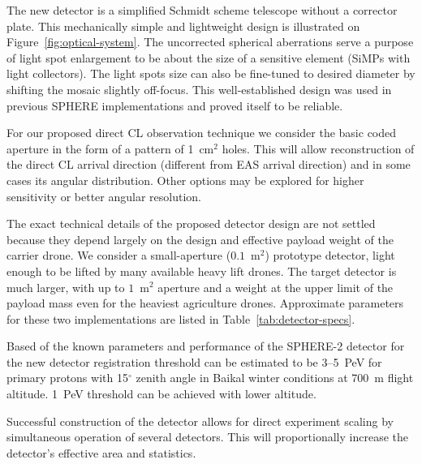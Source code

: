 \documentclass[a4paper,11pt]{article}
\begin{document}
The new detector is a simplified Schmidt scheme telescope without a corrector plate. This mechanically simple and lightweight design is illustrated on Figure~\ref{fig:optical-system}. The uncorrected spherical aberrations serve a purpose of light spot enlargement to be about the size of a sensitive element (SiMPs with light collectors). The light spots size can also be fine-tuned to desired diameter by shifting the mosaic slightly off-focus. This well-established design was used in previous SPHERE implementations and proved itself to be reliable.

For our proposed direct CL observation technique we consider the basic coded aperture in the form of a pattern of 1~cm$^2$ holes. This will allow reconstruction of the direct CL arrival direction (different from EAS arrival direction) and in some cases its angular distribution. Other options may be explored for higher sensitivity or better angular resolution.

The exact technical details of the proposed detector design are not settled because they depend largely on the design and effective payload weight of the carrier drone. We consider a small-aperture ($0.1$~m$^2$) prototype detector, light enough to be lifted by many available heavy lift drones. The target detector is much larger, with up to $1$~m$^2$ aperture and a weight at the upper limit of the payload mass even for the heaviest agriculture drones. Approximate parameters for these two implementations are listed in Table~\ref{tab:detector-specs}.


Based of the known parameters and performance of the SPHERE-2 detector for the new detector registration threshold can be estimated to be 3--5~PeV for primary protons with 15$^\circ$ zenith angle in Baikal winter conditions at 700~m flight altitude. 1~PeV threshold can be achieved with lower altitude.

Successful construction of the detector allows for direct experiment scaling by simultaneous operation of several detectors. This will proportionally increase the detector's effective area and statistics.
\end{document}
